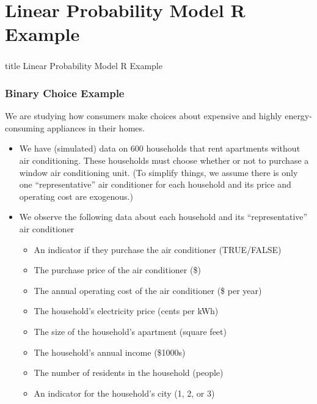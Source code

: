 \documentclass{beamer}\usepackage[]{graphicx}\usepackage[]{xcolor}
\begin{document}
\section{Linear Probability Model R Example}
\label{example}
\begin{frame}\frametitle{}
    \vfill
    \centering
    \begin{beamercolorbox}[center]{title}
        \Large Linear Probability Model R Example
    \end{beamercolorbox}
    \vfill
\end{frame}

\begin{frame}\frametitle{Binary Choice Example}
    We are studying how consumers make choices about expensive and highly energy-consuming appliances in their homes.
    \begin{itemize}
        \item We have (simulated) data on 600 households that rent apartments without air conditioning. These households must choose whether or not to purchase a window air conditioning unit. (To simplify things, we assume there is only one ``representative'' air conditioner for each household and its price and operating cost are exogenous.)
        \item We observe the following data about each household and its ``representative'' air conditioner
        \begin{itemize}
            \item An indicator if they purchase the air conditioner (TRUE/FALSE)
            \item The purchase price of the air conditioner (\$)
            \item The annual operating cost of the air conditioner (\$ per year)
            \item The household's electricity price (cents per kWh)
            \item The size of the household's apartment (square feet)
            \item The household's annual income (\$1000s)
            \item The number of residents in the household (people)
            \item An indicator for the household's city (1, 2, or 3) 
        \end{itemize}
    \end{itemize}
\end{frame}
\end{document}

